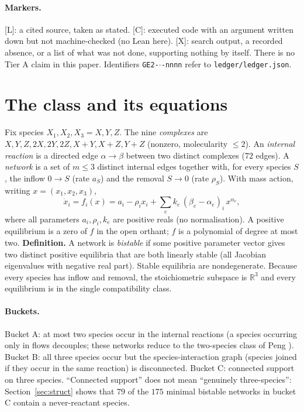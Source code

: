 \documentclass[11pt]{article}
\newcommand{\tier}[1]{\textsf{[#1]}}
\newcommand{\tL}{\tier{L}}
\newcommand{\tC}{\tier{C}}
\newcommand{\tX}{\tier{X}}
\newcommand{\R}{\mathbb{R}}
\begin{document}
\paragraph{Markers.} \tL{}: a cited source, taken as stated. \tC{}: executed code with an argument written down but not machine-checked (no Lean here). \tX{}: search output, a recorded absence, or a list of what was not done, supporting nothing by itself. There is no Tier A claim in this paper. Identifiers \texttt{GE2-$\cdot$-nnnn} refer to \texttt{ledger/ledger.json}.

\section{The class and its equations}\label{sec:class}
Fix species $X_1,X_2,X_3=X,Y,Z$. The nine \emph{complexes} are $X,Y,Z,2X,2Y,2Z,X{+}Y,X{+}Z,Y{+}Z$ (nonzero, molecularity $\le2$). An \emph{internal reaction} is a directed edge $\alpha\to\beta$ between two distinct complexes ($72$ edges). A \emph{network} is a set of $m\le3$ distinct internal edges together with, for every species $S$, the inflow $0\to S$ (rate $a_S$) and the removal $S\to0$ (rate $\rho_S$). With mass action, writing $x=(x_1,x_2,x_3)$,
\begin{equation}\label{eq:ode}
\dot x_i=f_i(x)=a_i-\rho_i x_i+\sum_{e}k_e\,(\beta_e-\alpha_e)_i\,x^{\alpha_e},
\end{equation}
where all parameters $a_i,\rho_i,k_e$ are positive reals (no normalisation). A positive equilibrium is a zero of $f$ in the open orthant; $f$ is a polynomial of degree at most two. \textbf{Definition.} A network is \emph{bistable} if some positive parameter vector gives two distinct positive equilibria that are both linearly stable (all Jacobian eigenvalues with negative real part). Stable equilibria are nondegenerate. Because every species has inflow and removal, the stoichiometric subspace is $\R^3$ and every equilibrium is in the single compatibility class.

\paragraph{Buckets.} Bucket A: at most two species occur in the internal reactions (a species occurring only in flows decouples; these networks reduce to the two-species class of Peng \cite{peng}). Bucket B: all three species occur but the species-interaction graph (species joined if they occur in the same reaction) is disconnected. Bucket C: connected support on three species. ``Connected support'' does not mean ``genuinely three-species'': Section~\ref{sec:struct} shows that $79$ of the $175$ minimal bistable networks in bucket C contain a never-reactant species.
\end{document}
